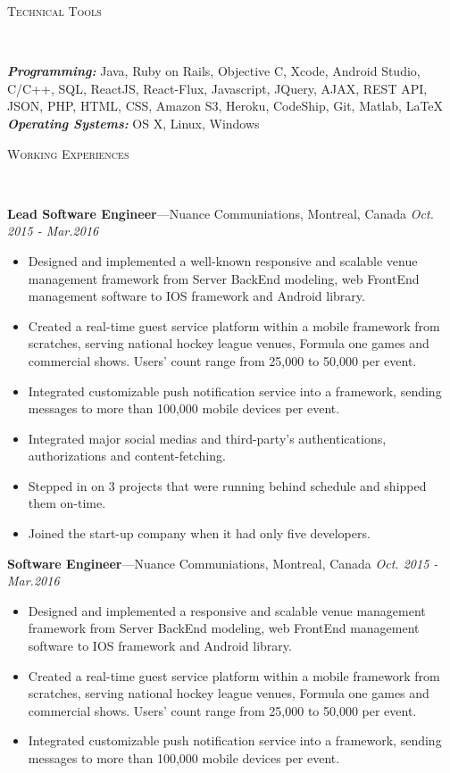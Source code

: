 \documentclass[11pt]{article}
\newenvironment{changemargin}[2]{%
  \begin{list}{}{%
    \setlength{\topsep}{0pt}%
    \setlength{\leftmargin}{#1}%
    \setlength{\rightmargin}{#2}%
    \setlength{\listparindent}{\parindent}%
    \setlength{\itemindent}{\parindent}%
    \setlength{\parsep}{\parskip}%
  }%
  \item[]}{\end{list}
}
\newcommand{\lineover}{
	\begin{changemargin}{-0.05in}{-0.05in}
		\vspace*{-8pt}
		\hrulefill \\
		\vspace*{-2pt}
	\end{changemargin}
}
\newcommand{\header}[1]{
	\begin{changemargin}{-0.5in}{-0.5in}
		\scshape{#1}\\
  	\lineover
	\end{changemargin}
}
\newenvironment{body} {
	\vspace*{-16pt}
	\begin{changemargin}{-0.25in}{-0.5in}
  }	
	{\end{changemargin}
}
\begin{document}
\header{Technical Tools}
\begin{body}
	\vspace{14pt}
	\emph{\textbf{Programming:}}{} Java, Ruby on Rails, Objective C, Xcode, Android Studio, C/C++, SQL, ReactJS, React-Flux, Javascript, JQuery, AJAX, REST API, JSON, PHP, HTML, CSS, Amazon S3, Heroku, CodeShip, Git, Matlab, \LaTeX\\
\medskip
	\emph{\textbf{Operating Systems:}}{} OS X, Linux, Windows\\
\end{body}
\smallskip
\header{Working Experiences}
\begin{body}
	\vspace{14pt}
	\textbf{Lead Software Engineer}---Nuance Communiations, Montreal, Canada  \hfill \emph{Oct. 2015 - Mar.2016}\\
	\begin{itemize} \itemsep -0pt  %
		\item Designed and implemented a well-known responsive and scalable venue management framework from Server BackEnd modeling, web FrontEnd management software to IOS framework and Android library.
		\item Created a real-time guest service platform within a mobile framework from scratches, serving national hockey league venues, Formula one games and commercial shows. Users' count range from 25,000 to 50,000 per event.
		\item Integrated customizable push notification service into a framework, sending messages to more than 100,000 mobile devices per event.
		\item Integrated major social medias and third-party's authentications, authorizations and content-fetching.
		\item Stepped in on 3 projects that were running behind schedule and shipped them on-time.
		\item Joined the start-up company when it had only five developers.
	\end{itemize}
	\vspace{14pt}
	\textbf{Software Engineer}---Nuance Communiations, Montreal, Canada  \hfill \emph{Oct. 2015 - Mar.2016}\\
	\begin{itemize} \itemsep -0pt  %
		\item Designed and implemented a responsive and scalable venue management framework from Server BackEnd modeling, web FrontEnd management software to IOS framework and Android library.
		\item Created a real-time guest service platform within a mobile framework from scratches, serving national hockey league venues, Formula one games and commercial shows. Users' count range from 25,000 to 50,000 per event.
		\item Integrated customizable push notification service into a framework, sending messages to more than 100,000 mobile devices per event.
	\end{itemize}
	

\end{body}
\end{document}
